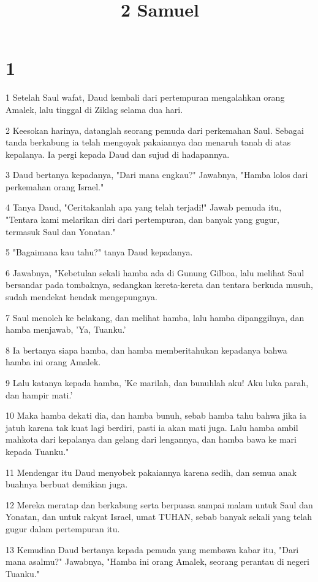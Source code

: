 

\title{2 Samuel}


\chapter{1}

\par 1 Setelah Saul wafat, Daud kembali dari pertempuran mengalahkan orang Amalek, lalu tinggal di Ziklag selama dua hari.
\par 2 Keesokan harinya, datanglah seorang pemuda dari perkemahan Saul. Sebagai tanda berkabung ia telah mengoyak pakaiannya dan menaruh tanah di atas kepalanya. Ia pergi kepada Daud dan sujud di hadapannya.
\par 3 Daud bertanya kepadanya, "Dari mana engkau?" Jawabnya, "Hamba lolos dari perkemahan orang Israel."
\par 4 Tanya Daud, "Ceritakanlah apa yang telah terjadi!" Jawab pemuda itu, "Tentara kami melarikan diri dari pertempuran, dan banyak yang gugur, termasuk Saul dan Yonatan."
\par 5 "Bagaimana kau tahu?" tanya Daud kepadanya.
\par 6 Jawabnya, "Kebetulan sekali hamba ada di Gunung Gilboa, lalu melihat Saul bersandar pada tombaknya, sedangkan kereta-kereta dan tentara berkuda musuh, sudah mendekat hendak mengepungnya.
\par 7 Saul menoleh ke belakang, dan melihat hamba, lalu hamba dipanggilnya, dan hamba menjawab, 'Ya, Tuanku.'
\par 8 Ia bertanya siapa hamba, dan hamba memberitahukan kepadanya bahwa hamba ini orang Amalek.
\par 9 Lalu katanya kepada hamba, 'Ke marilah, dan bunuhlah aku! Aku luka parah, dan hampir mati.'
\par 10 Maka hamba dekati dia, dan hamba bunuh, sebab hamba tahu bahwa jika ia jatuh karena tak kuat lagi berdiri, pasti ia akan mati juga. Lalu hamba ambil mahkota dari kepalanya dan gelang dari lengannya, dan hamba bawa ke mari kepada Tuanku."
\par 11 Mendengar itu Daud menyobek pakaiannya karena sedih, dan semua anak buahnya berbuat demikian juga.
\par 12 Mereka meratap dan berkabung serta berpuasa sampai malam untuk Saul dan Yonatan, dan untuk rakyat Israel, umat TUHAN, sebab banyak sekali yang telah gugur dalam pertempuran itu.
\par 13 Kemudian Daud bertanya kepada pemuda yang membawa kabar itu, "Dari mana asalmu?" Jawabnya, "Hamba ini orang Amalek, seorang perantau di negeri Tuanku."
